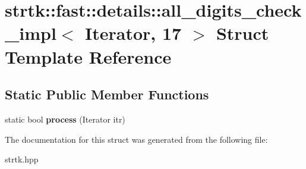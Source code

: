 \hypertarget{structstrtk_1_1fast_1_1details_1_1all__digits__check__impl_3_01Iterator_00_0117_01_4}{\section{strtk\-:\-:fast\-:\-:details\-:\-:all\-\_\-digits\-\_\-check\-\_\-impl$<$ Iterator, 17 $>$ Struct Template Reference}
\label{structstrtk_1_1fast_1_1details_1_1all__digits__check__impl_3_01Iterator_00_0117_01_4}
}
\subsection*{Static Public Member Functions}
\begin{DoxyCompactItemize}
\item 
\hypertarget{structstrtk_1_1fast_1_1details_1_1all__digits__check__impl_3_01Iterator_00_0117_01_4_a0e9ed545ed670a9ea09fea705e5f1a26}{static bool {\bfseries process} (Iterator itr)}\label{structstrtk_1_1fast_1_1details_1_1all__digits__check__impl_3_01Iterator_00_0117_01_4_a0e9ed545ed670a9ea09fea705e5f1a26}

\end{DoxyCompactItemize}


The documentation for this struct was generated from the following file\-:\begin{DoxyCompactItemize}
\item 
strtk.\-hpp\end{DoxyCompactItemize}
